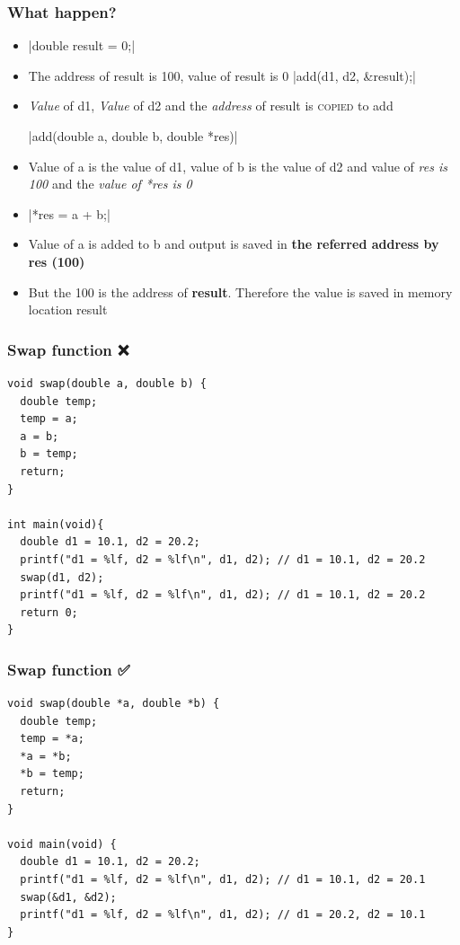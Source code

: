 \documentclass{../c-lecture}
\begin{document}
\begin{frame}[fragile]
  \frametitle{What happen?}
  \begin{itemize}
    \item[]
    |double result = 0;|
    \item The address of result is 100, value of result is 0
    |add(d1, d2, &result);|
    \item
      \textit{\color{YellowOrange} Value} of d1,
      \textit{\color{YellowOrange} Value} of d2 and the
      \textit{\color{LimeGreen} address} of result is
      \textsc{\color{Purple} copied} to add

    |add(double a, double b, double *res)|
    \item
      Value of a is the value of d1, value of b is the value of d2 and value
      of \textit{\color{LimeGreen} res is 100} and the
      \textit{\color{YellowOrange} value of *res is 0}
  \end{itemize}
\end{frame}

\begin{frame}[fragile]
  \begin{itemize}
    \item[]
    |*res = a + b;|
    \item
      Value of a is added to b and output is saved in
      \textbf{\color{YellowOrange} the referred address by res (100)}
    \item
      But the 100 is the address of \textbf{\color{Cyan} result}.
      Therefore the value is saved in memory location result
  \end{itemize}
\end{frame}

\begin{frame}[fragile]
  \frametitle{Swap function ❌}
  \scriptsize
  \begin{verbatim}
void swap(double a, double b) {
  double temp;
  temp = a;
  a = b;
  b = temp;
  return;
}

int main(void){
  double d1 = 10.1, d2 = 20.2;
  printf("d1 = %lf, d2 = %lf\n", d1, d2); // d1 = 10.1, d2 = 20.2
  swap(d1, d2);
  printf("d1 = %lf, d2 = %lf\n", d1, d2); // d1 = 10.1, d2 = 20.2
  return 0;
}
  \end{verbatim}
\end{frame}

\begin{frame}[fragile]
  \frametitle{Swap function ✅}
  \scriptsize
  \begin{verbatim}
void swap(double *a, double *b) {
  double temp;
  temp = *a;
  *a = *b;
  *b = temp;
  return;
}

void main(void) {
  double d1 = 10.1, d2 = 20.2;
  printf("d1 = %lf, d2 = %lf\n", d1, d2); // d1 = 10.1, d2 = 20.1
  swap(&d1, &d2);
  printf("d1 = %lf, d2 = %lf\n", d1, d2); // d1 = 20.2, d2 = 10.1
}
  \end{verbatim}
\end{frame}
\end{document}
